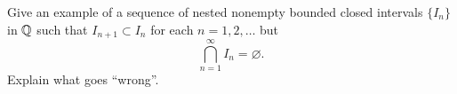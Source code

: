 \begin{exercise}
  \label{ex:hw02:nested-rational-intervals}
  Give an example of a sequence of nested nonempty bounded closed intervals
  $\{I_n\}$ in $\mathbb{Q}$ such that $I_{n+1}\subset I_n$ for each
  $n=1,2,\ldots$ but
  \[
    \bigcap_{n=1}^{\infty} I_n=\varnothing.
  \]
  Explain what goes ``wrong''.
\end{exercise}
